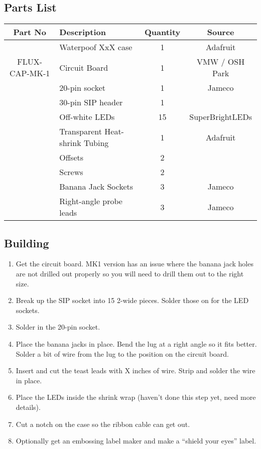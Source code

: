 \documentclass[11pt]{article}
\begin{document}
\subsection{Parts List}

\begin{tabular}{|c|l|c|c|}
\hline
Part No	&  Description			&  Quantity	& Source \\
\hline
\hline
	& Waterpoof XxX case		& 1		& Adafruit \\
\hline
FLUX-CAP-MK-1	& Circuit Board		& 1		& VMW / OSH Park \\
\hline
	& 20-pin socket			& 1		& Jameco \\
\hline
	& 30-pin SIP header		& 1		&	\\
\hline
	& Off-white LEDs		& 15		& SuperBrightLEDs \\
\hline
	& Transparent Heat-shrink Tubing &	1	& Adafruit \\
\hline
	& Offsets			& 2		& \\
\hline
	& Screws			& 2		& \\
\hline
	& Banana Jack Sockets		& 3		& Jameco \\
\hline
	& Right-angle probe leads	& 3		& Jameco \\
\hline
\hline
\end{tabular}

\subsection{Building}

\begin{enumerate}

\item Get the circuit board.  MK1 version has an issue where the
	banana jack holes are not drilled out properly so you will
	need to drill them out to the right size.
\item Break up the SIP socket into 15 2-wide pieces.
	Solder those on for the LED sockets.
\item Solder in the 20-pin socket.
\item Place the banana jacks in place.  
	Bend the lug at a right angle so it fits better.
	Solder a bit of wire from the lug to the position on the
	circuit board.
\item Insert and cut the teast leads with X inches of wire.  Strip
	and solder the wire in place.
\item Place the LEDs inside the shrink wrap (haven't done this step
	yet, need more details).
\item Cut a notch on the case so the ribbon cable can get out.
\item Optionally get an embossing label maker and make a 
	``shield your eyes'' label.

\end{enumerate}
\end{document}
